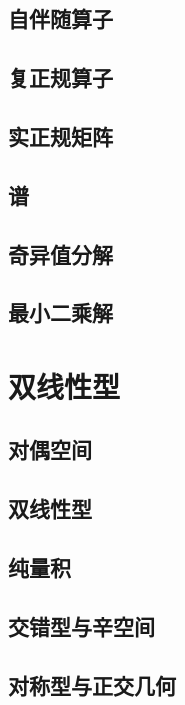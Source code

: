 \documentclass[a4paper, 11pt]{ctexbook}
\begin{document}
        \section{自伴随算子}
        \section{复正规算子}
        \section{实正规矩阵}
        \section{谱}
        \section{奇异值分解}
        \section{最小二乘解}
    \chapter{双线性型}
        \section{对偶空间}
        \section{双线性型}
        \section{纯量积}
        \section{交错型与辛空间}
        \section{对称型与正交几何}
\end{document}

